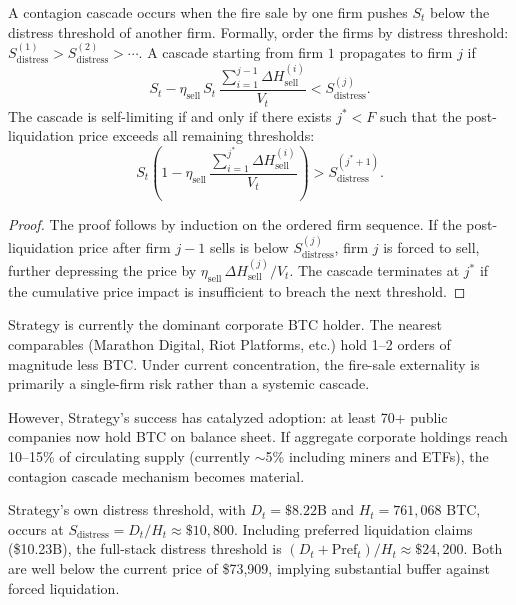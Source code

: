 \begin{theorem}
\label{thm:contagion}
A contagion cascade occurs when the fire sale by one firm pushes
$S_t$ below the distress threshold of another firm. Formally,
order the firms by distress threshold:
$S^{(1)}_{\mathrm{distress}} > S^{(2)}_{\mathrm{distress}} > \cdots$.
A cascade starting from firm $1$ propagates to firm $j$ if
\begin{equation}
  S_t - \eta_{\mathrm{sell}}\,S_t\,
  \frac{\sum_{i=1}^{j-1} \Delta H^{(i)}_{\mathrm{sell}}}{V_t}
  < S^{(j)}_{\mathrm{distress}}.
  \label{eq:contagion}
\end{equation}
The cascade is self-limiting if and only if there exists $j^* < F$
such that the post-liquidation price exceeds all remaining thresholds:
\begin{equation}
  S_t\left(1 - \eta_{\mathrm{sell}}\,
  \frac{\sum_{i=1}^{j^*} \Delta H^{(i)}_{\mathrm{sell}}}{V_t}\right)
  > S^{(j^*+1)}_{\mathrm{distress}}.
  \label{eq:cascade_limit}
\end{equation}
\end{theorem}

\begin{proof}
The proof follows by induction on the ordered firm sequence.
If the post-liquidation price after firm $j-1$ sells is below
$S^{(j)}_{\mathrm{distress}}$, firm $j$ is forced to sell,
further depressing the price by
$\eta_{\mathrm{sell}}\,\Delta H^{(j)}_{\mathrm{sell}} / V_t$.
The cascade terminates at $j^*$ if the cumulative price impact
is insufficient to breach the next threshold.
\end{proof}

\begin{remark}
Strategy is currently the dominant corporate BTC holder.
The nearest comparables (Marathon Digital, Riot Platforms, etc.)
hold 1--2 orders of magnitude less BTC.
Under current concentration, the fire-sale externality is
primarily a single-firm risk rather than a systemic cascade.

However, Strategy's success has catalyzed adoption: at least 70+
public companies now hold BTC on balance sheet.
If aggregate corporate holdings reach 10--15\% of circulating supply
(currently $\sim$5\% including miners and ETFs), the contagion cascade
mechanism becomes material.

Strategy's own distress threshold, with $D_t = \$8.22$B and
$H_t = 761{,}068$ BTC, occurs at
$S_{\mathrm{distress}} = D_t / H_t \approx \$10{,}800$.
Including preferred liquidation claims (\$10.23B),
the full-stack distress threshold is
$(D_t + \text{Pref}_t) / H_t \approx \$24{,}200$.
Both are well below the current price of \$73{,}909, implying
substantial buffer against forced liquidation.
\end{remark}

